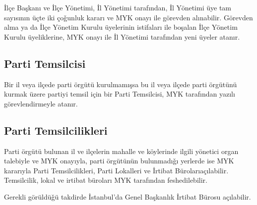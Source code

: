 \documentclass[11pt]{article} %
\begin{document}
İlçe Başkanı ve İlçe Yönetimi, İl Yönetimi tarafından, İl Yönetimi üye tam sayısının üçte iki çoǧunluk kararı ve MYK onayı ile görevden alınabilir. Görevden alma ya da İlçe Yönetim Kurulu üyelerinin istifaları ile boşalan İlçe Yönetim Kurulu üyeliklerine, MYK onayı ile İl Yönetimi tarafından yeni üyeler atanır.
\subsection{Parti Temsilcisi}
Bir il veya ilçede parti örgütü kurulmamışsa bu il veya ilçede parti örgütünü kurmak üzere partiyi temsil için bir Parti Temsilcisi, MYK tarafından yazılı görevlendirmeyle atanır.

\subsection{Parti Temsilcilikleri}
Parti örgütü bulunan il ve ilçelerin mahalle ve köylerinde ilgili yönetici organ talebiyle ve MYK onayıyla, parti örgütünün bulunmadıǧı yerlerde ise MYK kararıyla Parti Temsilcilikleri, Parti Lokalleri ve İrtibat Bürolarıaçılabilir. Temsilcilik, lokal ve irtibat büroları MYK tarafından feshedilebilir.

Gerekli görüldüǧü takdirde İstanbul’da Genel Başkanlık İrtibat Bürosu açılabilir.
\end{document}
